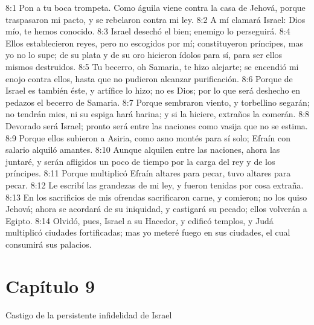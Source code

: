 							8:1 Pon a tu boca trompeta. Como águila viene contra la casa de Jehová, porque traspasaron mi pacto, y se rebelaron contra mi ley. 
							8:2 A mí clamará Israel: Dios mío, te hemos conocido. 
							8:3 Israel desechó el bien; enemigo lo perseguirá. 
							8:4 Ellos establecieron reyes, pero no escogidos por mí; constituyeron príncipes, mas yo no lo supe; de su plata y de su oro hicieron ídolos para sí, para ser ellos mismos destruidos. 
							8:5 Tu becerro, oh Samaria, te hizo alejarte; se encendió mi enojo contra ellos, hasta que no pudieron alcanzar purificación. 
							8:6 Porque de Israel es también éste, y artífice lo hizo; no es Dios; por lo que será deshecho en pedazos el becerro de Samaria. 
							8:7 Porque sembraron viento, y torbellino segarán; no tendrán mies, ni su espiga hará harina; y si la hiciere, extraños la comerán. 
							8:8 Devorado será Israel; pronto será entre las naciones como vasija que no se estima. 
							8:9 Porque ellos subieron a Asiria, como asno montés para sí solo; Efraín con salario alquiló amantes. 
							8:10 Aunque alquilen entre las naciones, ahora las juntaré, y serán afligidos un poco de tiempo por la carga del rey y de los príncipes. 
							8:11 Porque multiplicó Efraín altares para pecar, tuvo altares para pecar. 
							8:12 Le escribí las grandezas de mi ley, y fueron tenidas por cosa extraña. 
							8:13 En los sacrificios de mis ofrendas sacrificaron carne, y comieron; no los quiso Jehová; ahora se acordará de su iniquidad, y castigará su pecado; ellos volverán a Egipto. 
							8:14 Olvidó, pues, Israel a su Hacedor, y edificó templos, y Judá multiplicó ciudades fortificadas; mas yo meteré fuego en sus ciudades, el cual consumirá sus palacios. 
							\section*{Capítulo 9 }
								Castigo de la persistente infidelidad de Israel 
								
